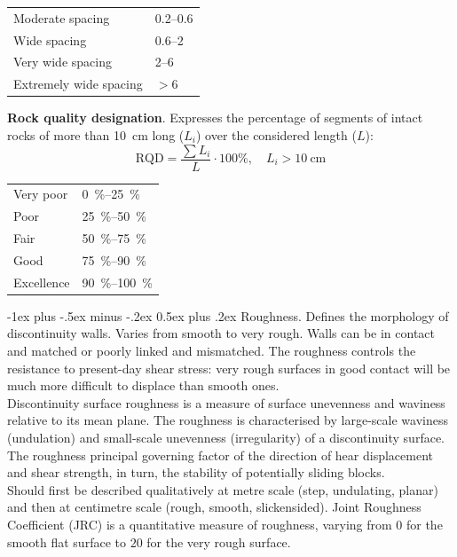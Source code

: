 \documentclass[10pt,landscape,a4paper]{article}
\makeatletter
\renewcommand{\section}{\@startsection{section}{1}{0mm}%
	{-1ex plus -.5ex minus -.2ex}%
	{0.5ex plus .2ex}%
	{\normalfont\large\bfseries}}
\makeatother
\begin{document}
\begin{multicols}{3}
\begin{table}[H]
\begin{tabular}{ll}
			Moderate spacing        & \SIrange{0.2}{0.6}{}          \\
			Wide spacing            & \SIrange{0.6}{2}{}            \\
			Very wide spacing       & \SIrange{2}{6}{}              \\
			Extremely wide spacing  & $>6$                          \\
		\end{tabular}\end{table}
	\textbf{Rock quality designation}.
	Expresses the percentage of segments of intact rocks of more than \SI{10}{\centi\meter} long ($L_i$) over the considered length ($L$):
	\[
		\text{RQD}=\frac{\sum{L_i}}{L}\cdot100\%,\quad L_i>\SI{10}{\centi\meter}
	\]
	\begin{table}[H]\scriptsize\centering\begin{tabular}{ll}
			Very poor  & \SIrange{0}{25}{\percent}   \\
			Poor       & \SIrange{25}{50}{\percent}  \\
			Fair       & \SIrange{50}{75}{\percent}  \\
			Good       & \SIrange{75}{90}{\percent}  \\
			Excellence & \SIrange{90}{100}{\percent} \\
		\end{tabular}\end{table}
	
	\section{Roughness.}
	Defines the morphology of discontinuity walls.
	Varies from smooth to very rough.
	Walls can be in contact and matched or poorly linked and mismatched.
	The roughness controls the resistance to present-day shear stress: very rough surfaces in good contact will be much more difficult to displace than smooth ones.\\
	Discontinuity surface roughness is a measure of surface unevenness and waviness relative to its mean plane.
	The roughness is characterised by large-scale waviness (undulation) and small-scale unevenness (irregularity) of a discontinuity surface.
	The roughness principal governing factor of the direction of hear displacement and shear strength, in turn, the stability of potentially sliding blocks.\\
	Should first be described qualitatively at metre scale (step, undulating, planar) and then at centimetre scale (rough, smooth, slickensided).
	Joint Roughness Coefficient (JRC) is a quantitative measure of roughness, varying from $0$ for the smooth flat surface to $20$ for the very rough surface.
	

\end{multicols}
\end{document}
